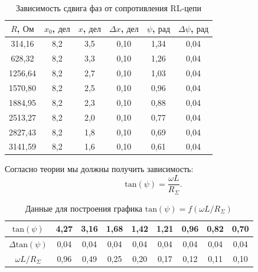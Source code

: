 \documentclass[a4paper, 12pt]{article}
\begin{document}
    \begin{table}[ht]
        \centering
        \begin{tabular}{|c|c|c|c|c|c|}
            \hline
            $R$, $\text{Ом}$ & $x_0$, $\text{дел}$ & $x$, $\text{дел}$ & $\Delta x$, $\text{дел}$ & $\psi$, $\text{рад}$ & $\Delta \psi$, $\text{рад}$ \\
            \hline
            314,16 & 8,2 & 3,5 & 0,10 & 1,34 & 0,04 \\
            \hline
            628,32 & 8,2 & 3,3 & 0,10 & 1,26 & 0,04 \\
            \hline
            1256,64 & 8,2 & 2,7 & 0,10 & 1,03 & 0,04 \\
            \hline
            1570,80 & 8,2 & 2,5 & 0,10 & 0,96 & 0,04 \\
            \hline
            1884,95 & 8,2 & 2,3 & 0,10 & 0,88 & 0,04 \\
            \hline
            2513,27 & 8,2 & 2,0 & 0,10 & 0,77 & 0,04 \\
            \hline
            2827,43 & 8,2 & 1,8 & 0,10 & 0,69 & 0,04 \\
            \hline
            3141,59 & 8,2 & 1,6 & 0,10 & 0,61 & 0,04 \\
            \hline
        \end{tabular}
        \caption{Зависимость сдвига фаз от сопротивления RL-цепи}
        \label{table2}
    \end{table}
    
    Согласно теории мы должны получить зависимость:
    \begin{equation}
        \mathrm{tan}(\psi) = \frac{\omega L}{R_{\Sigma}}.
    \end{equation}
    
    \begin{table}[ht]
        \centering
        \begin{tabular}{|c|c|c|c|c|c|c|c|c|}
            \hline
            $\mathrm{tan}(\psi)$ & 4,27 & 3,16 & 1,68 & 1,42 & 1,21 & 0,96 & 0,82 & 0,70 \\
            \hline
            $\Delta \mathrm{tan}(\psi)$ & 0,04 & 0,04 & 0,04 & 0,04 & 0,04 & 0,04 & 0,04 & 0,04 \\
            \hline
            $\omega L / R_{\Sigma}$ & 0,96 & 0,49 & 0,25 & 0,20 & 0,17 & 0,12 & 0,11 & 0,10 \\
            \hline
        \end{tabular}
        \caption{Данные для построения графика $\mathrm{tan}(\psi) = f(\omega L / R_{\Sigma})$}
    \end{table}
    
\end{document}
